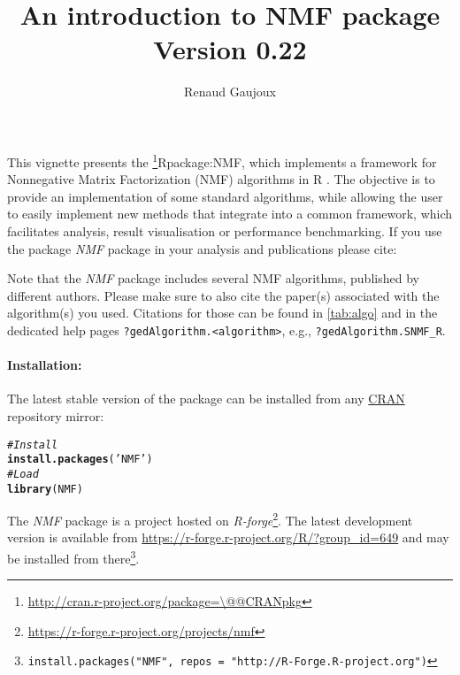 \documentclass[a4paper]{article}\usepackage[]{graphicx}\usepackage[]{color}
\makeatletter
\newcommand{\hlstr}[1]{\textcolor[rgb]{0.192,0.494,0.8}{#1}}%
\newcommand{\hlcom}[1]{\textcolor[rgb]{0.678,0.584,0.686}{\textit{#1}}}%
\newcommand{\hlstd}[1]{\textcolor[rgb]{0.345,0.345,0.345}{#1}}%
\newcommand{\hlkwd}[1]{\textcolor[rgb]{0.737,0.353,0.396}{\textbf{#1}}}%
\newenvironment{kframe}{%
 \def\at@end@of@kframe{}%
 \ifinner\ifhmode%
  \def\at@end@of@kframe{\end{minipage}}%
  \begin{minipage}{\columnwidth}%
 \fi\fi%
 \def\FrameCommand##1{\hskip\@totalleftmargin \hskip-\fboxsep
 \colorbox{shadecolor}{##1}\hskip-\fboxsep
     \hskip-\linewidth \hskip-\@totalleftmargin \hskip\columnwidth}%
 \MakeFramed {\advance\hsize-\width
   \@totalleftmargin\z@ \linewidth\hsize
   \@setminipage}}%
 {\par\unskip\endMakeFramed%
 \at@end@of@kframe}
\newenvironment{knitrout}{}{} %
\let\code=\texttt
\newcommand{\pkgname}[1]{\textit{#1}\xspace}
\newcommand{\Rpkg}[1]{\pkgname{#1} package\xspace}
\newcommand{\CRANurl}[1]{\url{http://cran.r-project.org/package=#1}}
\def\CRANpkg{\@ifstar\@CRANpkg\@@CRANpkg}
\def\@CRANpkg#1{\href{http://cran.r-project.org/package=#1}{\pkgname{#1}}\footnote{\CRANurl{#1}}}
\def\@@CRANpkg#1{\href{http://cran.r-project.org/package=#1}{\pkgname{#1}} package\footnote{\CRANurl{#1}}}
\def\citeCRANpkg{\@ifstar\@citeCRANpkg\@@citeCRANpkg}
\def\@citeCRANpkg#1{\CRANpkg{#1}\cite*{Rpackage:#1}}
\def\@@citeCRANpkg#1{\CRANpkg{#1}~\cite{Rpackage:#1}}
\newcommand{\nmfpack}{\Rpkg{NMF}}
\renewcommand{\cite}[1]{\parencite{#1}}
\makeatother
\begin{document}
\title{An introduction to NMF package\\
\small Version 0.22}
\author{Renaud Gaujoux}

\maketitle

This vignette presents the \citeCRANpkg{NMF}, which implements a framework
for Nonnegative Matrix Factorization (NMF) algorithms in R \cite{R}.
The objective is to provide an implementation of some standard algorithms, while
allowing the user to easily implement new methods that integrate into a
common framework, which facilitates analysis, result visualisation or
performance benchmarking.
If you use the package \nmfpack in your analysis and publications please cite:

\bigskip
{}

Note that the \nmfpack includes several NMF algorithms, published by different
authors.
Please make sure to also cite the paper(s) associated with the algorithm(s)
you used.
Citations for those can be found in \cref{tab:algo} and in the dedicated help
pages \code{?gedAlgorithm.<algorithm>}, e.g., \code{?gedAlgorithm.SNMF\_R}.

\bigskip
\paragraph{Installation:} The latest stable version of the package can be installed from any
\href{http://cran.r-project.org}{CRAN} repository mirror:
\begin{knitrout}
\color{fgcolor}\begin{kframe}
\begin{alltt}
\hlcom{# Install}
\hlkwd{install.packages}\hlstd{(}\hlstr{'NMF'}\hlstd{)}
\hlcom{# Load}
\hlkwd{library}\hlstd{(NMF)}
\end{alltt}
\end{kframe}
\end{knitrout}
The \nmfpack is a project hosted on \emph{R-forge}\footnote{\url{https://r-forge.r-project.org/projects/nmf}}.
The latest development version is available from \url{https://r-forge.r-project.org/R/?group_id=649} and may be installed from there\footnote{\code{install.packages("NMF", repos = "http://R-Forge.R-project.org")}}.
\end{document}
